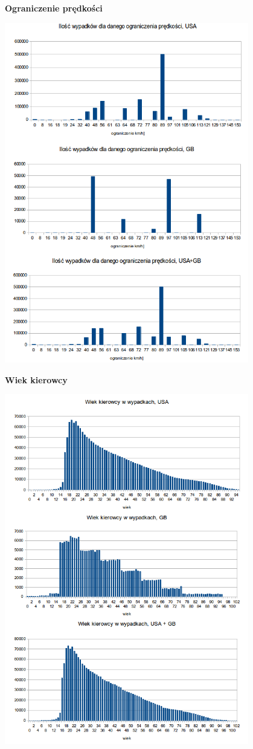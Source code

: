 \textbf{Ograniczenie prędkości}

\includegraphics[width=0.8\textwidth]{images/statistics/speed_limit.png}

\textbf{Wiek kierowcy}

\includegraphics[width=0.8\textwidth]{images/statistics/driver_age.png}

